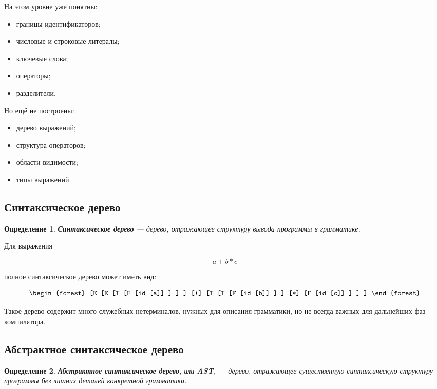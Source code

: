 \documentclass[12pt,a4paper]{article}
\newtheorem{definition}{Определение}
\begin{document}
На этом уровне уже понятны:
\begin{itemize}
    \item границы идентификаторов;
    \item числовые и строковые литералы;
    \item ключевые слова;
    \item операторы;
    \item разделители.
\end{itemize}

Но ещё не построены:
\begin{itemize}
    \item дерево выражений;
    \item структура операторов;
    \item области видимости;
    \item типы выражений.
\end{itemize}

\subsection{Синтаксическое дерево}

\begin{definition}
\textbf{Синтаксическое дерево} --- дерево, отражающее структуру вывода программы в грамматике.
\end{definition}

Для выражения

\[
a + b * c
\]

полное синтаксическое дерево может иметь вид:

\[
\begin{forest}
[E
    [E
        [T
            [F
                [id [a]]
            ]
        ]
    ]
    [+]
    [T
        [T
            [F
                [id [b]]
            ]
        ]
        [*]
        [F
            [id [c]]
        ]
    ]
]
\end{forest}
\]

Такое дерево содержит много служебных нетерминалов, нужных для описания грамматики, но не всегда важных для дальнейших фаз компилятора.

\subsection{Абстрактное синтаксическое дерево}

\begin{definition}
\textbf{Абстрактное синтаксическое дерево}, или \textbf{AST}, --- дерево, отражающее существенную синтаксическую структуру программы без лишних деталей конкретной грамматики.
\end{definition}
\end{document}
